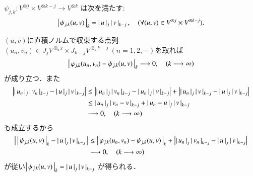 	\begin{screen}
		\begin{thm}\label{thm:property_of_the_completion_of_the_projective_norm}
			$\psi_{j,k}:V^{\otimes j} \times V^{\otimes k-j} \longrightarrow V^{\otimes k}$
			は次を満たす:
			\begin{align}
				\left|\, \psi_{j,k}(u,v)\, \right|_{k} = \left|\, u\, \right|_{j} \left|\, v\, \right|_{k-j},
				\quad (\forall (u,v) \in V^{\otimes j} \times V^{\otimes k-j}).
			\end{align}
		\end{thm}
	\end{screen}
	
	\begin{prf}
		$(u,v)$に直積ノルムで収束する点列$(u_n,v_n) \in J_j V^{\otimes_a j} \times J_{k-j} V^{\otimes_a k-j}\ (n=1,2,\cdots)$を取れば
		\begin{align}
			\left|\, \varphi_{j,k}(u_n,v_n) - \psi_{j,k}(u,v)\, \right|_{k} \longrightarrow 0,
			\quad (k \longrightarrow \infty)
		\end{align}
		が成り立つ．また
		\begin{align}
			\left| \left|\, u_n\, \right|_{j} \left|\, v_n\, \right|_{k-j} - 
			\left|\, u\, \right|_{j} \left|\, v\, \right|_{k-j} \right|
			&\leq \left| \left|\, u_n\, \right|_{j} \left|\, v_n\, \right|_{k-j} - 
			\left|\, u_n\, \right|_{j} \left|\, v\, \right|_{k-j} \right| 
			+ \left| \left|\, u_n\, \right|_{j} \left|\, v\, \right|_{k-j} - 
			\left|\, u\, \right|_{j} \left|\, v\, \right|_{k-j} \right| \\
			&\leq \left|\, u_n\, \right|_{j} \left|\, v_n - v\, \right|_{k-j} 
			+ \left|\, u_n - u\, \right|_{j} \left|\, v\, \right|_{k-j} \\
			&\longrightarrow 0, \quad (k \longrightarrow \infty)
		\end{align}
		も成立するから
		\begin{align}
			\left|\, \left|\, \psi_{j,k}(u,v)\, \right|_{k} - \left|\, u\, \right|_{j} \left|\, v\, \right|_{k-j}\, \right|
			&\leq \left|\, \varphi_{j,k}(u_n,v_n) - \psi_{j,k}(u,v)\, \right|_{k}
				+ \left| \left|\, u_n\, \right|_{j} \left|\, v_n\, \right|_{k-j} - 
			\left|\, u\, \right|_{j} \left|\, v\, \right|_{k-j} \right| \\
			& \longrightarrow 0, \quad (k \longrightarrow \infty)
		\end{align}
		が従い$\left|\, \psi_{j,k}(u,v)\, \right|_{k} = \left|\, u\, \right|_{j} \left|\, v\, \right|_{k-j}$
		が得られる．
		\QED
	\end{prf}
	
